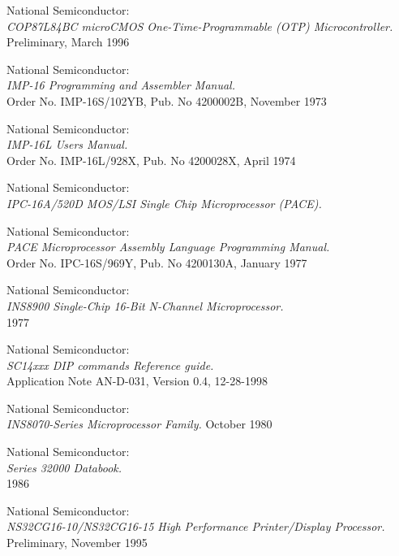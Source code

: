  National Semiconductor: \\
                   {\em COP87L84BC microCMOS One-Time-Programmable (OTP)
                    Microcontroller.\/} \\
                   Preliminary, March 1996

 National Semiconductor: \\
                   {\em IMP-16 Programming and Assembler Manual.\/} \\
                   Order No. IMP-16S/102YB, Pub. No 4200002B, November 1973

 National Semiconductor: \\
                   {\em IMP-16L Users Manual.\/} \\
                   Order No. IMP-16L/928X, Pub. No 4200028X, April 1974

 National Semiconductor: \\
                 {\em IPC-16A/520D MOS/LSI Single Chip Microprocessor (PACE).\/}

 National Semiconductor: \\
                  {\em PACE Microprocessor Assembly Language Programming Manual.\/} \\
                  Order No. IPC-16S/969Y, Pub. No 4200130A, January 1977

 National Semiconductor: \\
                   {\em INS8900 Single-Chip 16-Bit N-Channel Microprocessor.\/} \\
                   1977

 National Semiconductor: \\
                   {\em SC14xxx DIP commands Reference guide.} \\
                   Application Note AN-D-031, Version 0.4, 12-28-1998

 National Semiconductor: \\ 
                  {\em INS8070-Series Microprocessor Family.\/} 
                  October 1980 

 National Semiconductor: \\
                  {\em Series 32000 Databook.\/} \\
                  1986

 National Semiconductor: \\
                  {\em NS32CG16-10/NS32CG16-15 High Performance Printer/Display Processor.\/} \\
                  Preliminary, November 1995

